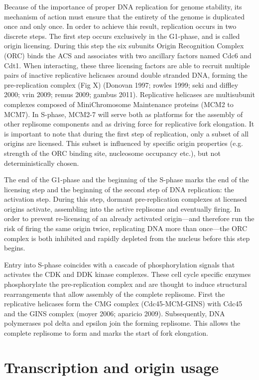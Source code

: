 Because of the importance of proper DNA replication for genome stability, its mechanism of action must ensure that the entirety of the genome is duplicated once and only once. In order to achieve this result, replication occurs in two discrete steps. The first step occurs exclusively in the G1-phase, and is called origin licensing. During this step the six subunits Origin Recognition Complex (ORC) binds the ACS and associates with two ancillary factors named Cdc6 and Cdt1. When interacting, these three licensing factors are able to recruit multiple pairs of inactive replicative helicases around double stranded DNA, forming the pre-replication complex (Fig X) (Donovan 1997; rowles 1999; seki and diffley 2000; vrin 2009; remus 2009; gambus 2011).  Replicative helicases are multisubunit complexes composed of MiniChromosome Maintenance proteins (MCM2 to MCM7). In S-phase, MCM2-7 will serve both as platforms for the assembly of other replisome components and as driving force for replicative fork elongation. It is important to note that during the first step of replication, only a subset of all origins are licensed. This subset is influenced by specific origin properties (e.g. strength of the ORC binding site, nucleosome occupancy etc.), but not deterministically chosen.

The end of the G1-phase and the beginning of the S-phase marks the end of the licensing step and the beginning of the second step of DNA replication: the activation step. During this step, dormant pre-replication complexes at licensed origins activate, assembling into the active replisome and eventually firing. In order to prevent re-licensing of an already activated origin—and therefore run the risk of firing the same origin twice, replicating DNA more than once—the ORC complex is both inhibited and rapidly depleted from the nucleus before this step begins. 

Entry into S-phase coincides with a cascade of phosphorylation signals that activates the CDK and DDK kinase complexes. These cell cycle specific enzymes phosphorylate the pre-replication complex and are thought to induce structural rearrangements that allow assembly of the complete replisome. First the replicative helicases form the CMG complex (Cdc45-MCM-GINS) with Cdc45 and the GINS complex (moyer 2006; aparicio 2009). Subsequently, DNA polymerases pol delta and epsilon join the forming replisome. This allows the complete replisome to form and marks the start of fork elongation.

\section{Transcription and origin usage}

